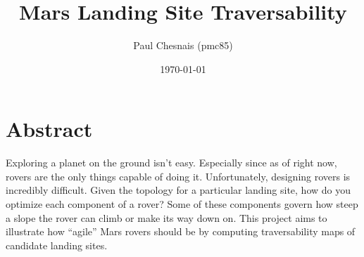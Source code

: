 \documentclass[12pt]{article}
\title{Mars Landing Site Traversability}
\author{Paul Chesnais (pmc85)}
\date{\today}
\begin{document}
\maketitle
\thispagestyle{empty}

\section{Abstract}
\label{sec:abstract}
Exploring a planet on the ground isn't easy. Especially since as of right now, rovers are the only things capable of doing it. Unfortunately, designing rovers is incredibly difficult. Given the topology for a particular landing site, how do you optimize each component of a rover? Some of these components govern how steep a slope the rover can climb or make its way down on. This project aims to illustrate how ``agile'' Mars rovers should be by computing traversability maps of candidate landing sites.
\end{document}
